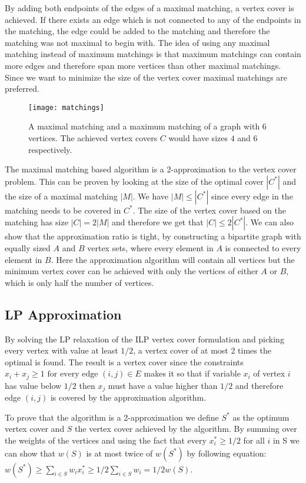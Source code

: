 By adding both endpoints of the edges of a maximal matching, a vertex cover is achieved. If there exists an edge which is not connected to any of the endpoints in the matching, the edge could be added to the matching and therefore the matching was not maximal to begin with. The idea of using any maximal matching instead of maximum matchings is that maximum matchings can contain more edges and therefore span more vertices than other maximal matchings. Since we want to minimize the size of the vertex cover maximal matchings are preferred.

\begin{figure}[H]
    \centering
    \texttt{[image: matchings]}
    \caption{A maximal matching and a maximum matching of a graph with 6 vertices. The achieved vertex covers $C$ would have sizes $4$ and $6$ respectively.}
\end{figure}

The maximal matching based algorithm is a 2-approximation to the vertex cover problem. This can be proven by looking at the size of the optimal cover $|C^*|$ and the size of a maximal matching $|M|$. We have $|M| \leq |C^*|$ since every edge in the matching needs to be covered in $C^*$. The size of the vertex cover based on the matching has size $|C| = 2|M|$ and therefore we get that $|C| \leq 2|C^*|$. We can also show that the approximation ratio is tight, by constructing a bipartite graph with equally sized $A$ and $B$ vertex sets, where every element in $A$ is connected to every element in $B$. Here the approximation algorithm will contain all vertices but the minimum vertex cover can be achieved with only the vertices of either $A$ or $B$, which is only half the number of vertices.

\subsection{LP Approximation}
By solving the LP relaxation of the ILP vertex cover formulation and picking every vertex with value at least $1/2$, a vertex cover of at most 2 times the optimal is found. The result is a vertex cover since the constraints $x_i + x_j \ge 1 \text{ for every edge } (i,j) \in E$ makes it so that if variable $x_i$ of vertex $i$ has value below $1/2$ then $x_j$ must have a value higher than $1/2$ and therefore edge $(i,j)$ is covered by the approximation algorithm.

To prove that the algorithm is a 2-approximation we define $S^*$ as the optimum vertex cover and $S$ the vertex cover achieved by the algorithm. By summing over the weights of the vertices and using the fact that every $x^*_i \ge 1/2$ for all $i$ in S we can show that $w(S)$ is at most twice of $w(S^*)$ by following equation: $w(S^*) \ge \sum_{i \in S} w_i x^*_i \ge 1/2 \sum_{i \in S} w_i = 1/2 w(S)$.

